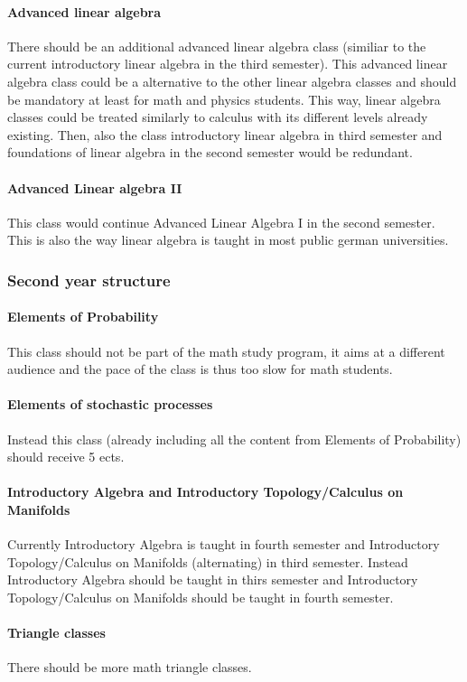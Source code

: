 \paragraph{Advanced linear algebra} There should be an additional advanced linear algebra class (similiar to the current introductory linear algebra in the third semester). 
This advanced linear algebra class could be a alternative to the other linear algebra classes and should be mandatory at least for math and physics students. 
This way, linear algebra classes could be treated similarly to calculus with its different levels already existing.
Then, also the class introductory linear algebra in third semester and foundations of linear algebra in the second semester would be redundant.
\paragraph{Advanced Linear algebra II} This class would continue Advanced Linear Algebra I in the second semester. 
This is also the way linear algebra is taught in most public german universities.
\subsubsection{Second year structure}
\label{sec-1-3-2}
\paragraph{Elements of Probability} This class should not be part of the math study program, it aims at a different audience and the pace of the class is thus too slow for math students. 
\paragraph{Elements of stochastic processes} Instead this class (already including all the content from Elements of Probability) should receive 5 ects.
\paragraph{Introductory Algebra and Introductory Topology/Calculus on Manifolds} Currently Introductory Algebra is taught in fourth semester and Introductory Topology/Calculus on Manifolds (alternating) in third semester. 
Instead Introductory Algebra should be taught in thirs semester and Introductory Topology/Calculus on Manifolds should be taught in fourth semester. 
\paragraph{Triangle classes} There should be more math triangle classes.
